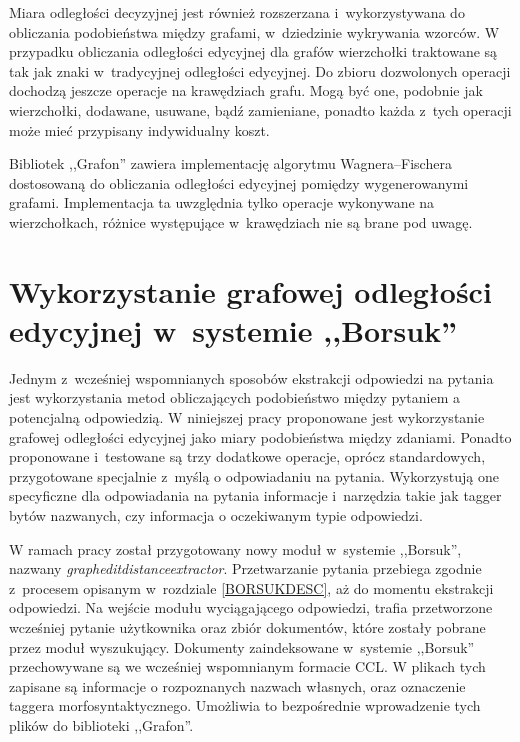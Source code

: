 \documentclass[a4paper, twoside, 12pt]{report}
\begin{document}
        Miara odległości decyzyjnej jest również rozszerzana i~wykorzystywana do obliczania podobieństwa między grafami,
        w~dziedzinie wykrywania wzorców. W przypadku obliczania odległości edycyjnej dla grafów wierzchołki traktowane
        są tak jak znaki w~tradycyjnej odległości edycyjnej. Do zbioru dozwolonych operacji dochodzą jeszcze operacje
        na krawędziach grafu. Mogą być one, podobnie jak wierzchołki, dodawane, usuwane, bądź zamieniane, ponadto każda
        z~tych operacji może mieć przypisany indywidualny koszt.

        Bibliotek ,,Grafon'' zawiera implementację algorytmu Wagnera–Fischera dostosowaną do obliczania odległości
        edycyjnej pomiędzy wygenerowanymi grafami. Implementacja ta uwzględnia tylko operacje wykonywane na wierzchołkach,
        różnice występujące w~krawędziach nie są brane pod uwagę.

    \section{Wykorzystanie grafowej odległości edycyjnej w~systemie ,,Borsuk''}
        Jednym z~wcześniej wspomnianych sposobów ekstrakcji odpowiedzi na pytania jest wykorzystania metod obliczających
        podobieństwo między pytaniem a potencjalną odpowiedzią. W niniejszej pracy proponowane jest wykorzystanie grafowej
        odległości edycyjnej jako miary podobieństwa między zdaniami. Ponadto proponowane i~testowane są trzy dodatkowe
        operacje, oprócz standardowych, przygotowane specjalnie z~myślą o odpowiadaniu na pytania. Wykorzystują one
        specyficzne dla odpowiadania na pytania informacje i~narzędzia takie jak tagger bytów nazwanych, czy informacja
        o oczekiwanym typie odpowiedzi.

        W ramach pracy został przygotowany nowy moduł w~systemie ,,Borsuk'', nazwany \emph{grapheditdistanceextractor}.
        Przetwarzanie pytania przebiega zgodnie z~procesem opisanym w~rozdziale \ref{BORSUKDESC}, aż do momentu ekstrakcji
        odpowiedzi. Na wejście modułu wyciągającego odpowiedzi, trafia przetworzone wcześniej pytanie użytkownika oraz
        zbiór dokumentów, które zostały pobrane przez moduł wyszukujący. Dokumenty zaindeksowane w~systemie ,,Borsuk''
        przechowywane są we wcześniej wspomnianym formacie CCL. W plikach tych zapisane są informacje o rozpoznanych
        nazwach własnych, oraz oznaczenie taggera morfosyntaktycznego. Umożliwia to bezpośrednie wprowadzenie tych plików
        do biblioteki ,,Grafon''.
\end{document}
